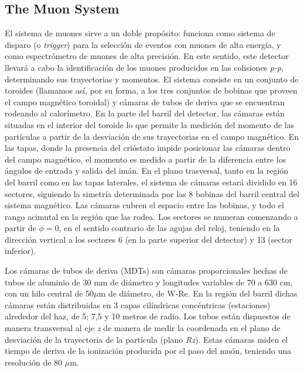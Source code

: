 \subsection{The Muon System}\label{sec:atlasCALO}
 El sistema de muones sirve a un doble prop\'osito: funciona como sistema de disparo (o \emph{trigger}) para la selecci\'on de eventos con muones de alta energ\'ia, y como espectr\'ometro de muones de alta precisi\'on. En este sentido, este detector llevar\'a a cabo la identificaci\'on de los muones producidos en las colisiones \emph{p-p}, determinando sus trayectorias y momentos.
   El sistema consiste en un conjunto de toroides (llamamos as\'i, por su forma, a los tres conjuntos de bobinas que proveen el campo magn\'etico toroidal) y c\'amaras de tubos de deriva que se encuentran rodeando al calor\'imetro. En la parte del barril del detector, las c\'amaras est\'an situadas en el interior del toroide lo que permite la medici\'on del momento de las part\'iculas a partir de la desviaci\'on de sus trayectorias en el campo magn\'etico. En las tapas, donde la presencia del cri\'ostato impide posicionar las c\'amaras dentro del campo magn\'etico, el momento es medido a partir de la diferencia entre los \'angulos de entrada y salida del im\'an.
En el plano trasversal, tanto en la regi\'on del barril como en las tapas laterales, el sistema de c\'amaras estar\'a dividido en 16 sectores, siguiendo la simetr\'ia determinada por las 8 bobinas del barril central del sistema magn\'etico. Las c\'amaras cubren el espacio entre las bobinas, y todo el rango acimutal en la regi\'on que las rodea. Los sectores se numeran comenzando a partir de $\phi = 0$, en el sentido contrario de las agujas del reloj, teniendo en la direcci\'on vertical a los sectores 6 (en la parte superior del detector) y 13 (sector inferior).  

   Los c\'amaras de tubos de deriva (MDTs) son c\'amaras proporcionales hechas de tubos de aluminio de 30 mm de di\'ametro y longitudes variables de 70 a 630 cm, con un hilo central de 50$\mu$m de di\'ametro, de W-Re. En la regi\'on del barril dichas c\'amaras est\'an distribuidas en 3 capas cil\'indricas conc\'entricas (estaciones) alrededor del haz, de 5; 7,5 y 10 metros de radio. Los tubos est\'an dispuestos de manera transversal al eje \emph{z} de manera de medir la coordenada en el plano de desviaci\'on de la trayectoria de la part\'icula (plano \emph{Rz}).  Estas c\'amaras miden el tiempo de deriva de la ionizaci\'on producida por el paso del mu\'on, teniendo una resoluci\'on de 80 $\mu$m.
   
